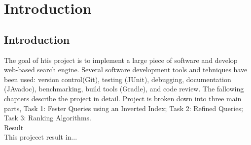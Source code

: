 \chapter{Introduction}


\section{Introduction}
The goal of htis project is to implement a large piece of software and develop web-based search engine. Several software development tools and tehniques have been used: version control(Git), testing (JUnit), debugging, documentation (JAvadoc), benchmarking, build tools (Gradle), and code review. The fallowing chapters describe the project in detail. Project is broken down into three main parts, Task 1: Fester Queries using an Inverted Index; Task 2: Refined Queries; Task 3: Ranking Algorithms.\\
Result\\
This projecct result in...\\


